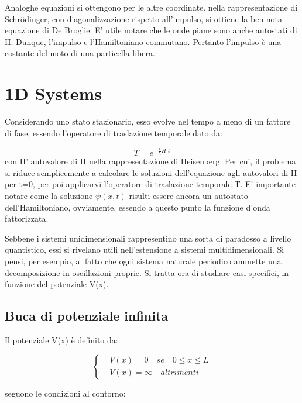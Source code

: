 \documentclass{article}
\begin{document}
Analoghe equazioni si ottengono per le altre coordinate.
nella rappresentazione di Schrödinger, con diagonalizzazione rispetto all'impulso, si ottiene la ben nota equazione di De Broglie.
E' utile notare che le onde piane sono anche autostati di H. Dunque, l'impulso e l'Hamiltoniano commutano. Pertanto l'impulso è una costante del moto di una particella libera.

\section{1D Systems}


Considerando uno stato stazionario, esso evolve nel tempo a meno di un fattore di fase, essendo l'operatore di traslazione temporale dato da:

\begin{equation}
  T=e^{-\frac{i}{\hbar}H't}
\end{equation}
con H' autovalore di H nella rappresentazione di Heisenberg.
Per cui, il problema si riduce semplicemente a calcolare le soluzioni dell'equazione agli autovalori di H per t=0, per poi applicarvi l'operatore di traslazione temporale T.
E' importante notare come la soluzione $\psi(x,t)$ risulti essere ancora un autostato dell'Hamiltoniano, ovviamente, essendo a questo punto la funzione d'onda fattorizzata.

Sebbene i sistemi unidimensionali rappresentino una sorta di paradosso a livello quantistico, essi si rivelano utili nell'estensione a sistemi multidimensionali.
Si pensi, per esempio, al fatto che ogni sistema naturale periodico ammette una decomposizione in oscillazioni proprie.
Si tratta ora di studiare casi specifici, in funzione del potenziale V(x).

\subsection{Buca di potenziale infinita}

Il potenziale V(x) è definito da:

\begin{equation}
  \left\{
  \begin{aligned}
     & V(x)=0 \quad se \quad 0\leq x\leq L \\
     & V(x)=\infty \quad altrimenti
  \end{aligned}
  \right.
\end{equation}

seguono le condizioni al contorno:
\end{document}
